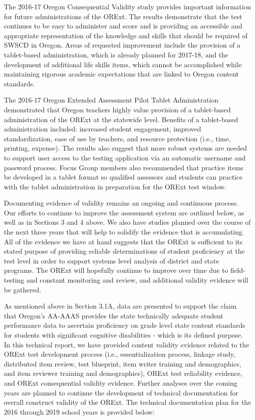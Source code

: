 \documentclass[]{article}
\begin{document}
The 2016-17 Oregon Consequential Validity study provides important
information for future administrations of the ORExt. The results
demonstrate that the test continues to be easy to administer and score
and is providing an accessible and appropriate representation of the
knowledge and skills that should be required of SWSCD in Oregon. Areas
of requested improvement include the provision of a tablet-based
administration, which is already planned for 2017-18, and the
development of additional life skills items, which cannot be
accomplished while maintaining rigorous academic expectations that are
linked to Oregon content standards.

The 2016-17 Oregon Extended Assessment Pilot Tablet Administration
demonstrated that Oregon teachers highly value provision of a
tablet-based administration of the ORExt at the statewide level.
Benefits of a tablet-based administration included: increased student
engagement, improved standardization, ease of use by teachers, and
resource protection (i.e., time, printing, expense). The results also
suggest that more robust systems are needed to support user access to
the testing application via an automatic username and password process.
Focus Group members also recommended that practice items be developed in
a tablet format so qualified assessors and students can practice with
the tablet administration in preparation for the ORExt test window.

Documenting evidence of validity remains an ongoing and continuous
process. Our efforts to continue to improve the assessment system are
outlined below, as well as in Sections 3 and 4 above. We also have
studies planned over the course of the next three years that will help
to solidify the evidence that is accumulating. All of the evidence we
have at hand suggests that the ORExt is sufficient to its stated purpose
of providing reliable determinations of student proficiency at the test
level in order to support systems level analysis of district and state
programs. The ORExt will hopefully continue to improve over time due to
field-testing and constant monitoring and review, and additional
validity evidence will be gathered.

As mentioned above in Section 3.1A, data are presented to support the
claim that Oregon's AA-AAAS provides the state technically adequate
student performance data to ascertain proficiency on grade level state
content standards for students with significant cognitive disabilities -
which is its defined purpose. In this technical report, we have provided
content validity evidence related to the ORExt test development process
(i.e., essentialization process, linkage study, distributed item review,
test blueprint, item writer training and demographics, and item reviewer
training and demographics), ORExt test reliability evidence, and ORExt
consequential validity evidence. Further analyses over the coming years
are planned to continue the development of technical documentation for
overall construct validity of the ORExt. The technical documentation
plan for the 2016 through 2019 school years is provided below:
\end{document}
